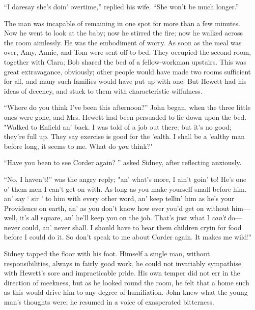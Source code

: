 ``I daresay she's doin' overtime,'' replied his wife. ``She won't be
much longer.''

The man was incapable of remaining in one spot for more than a few
minutes. Now he went to look at the baby; now he stirred the fire; now
he walked across the room aimlessly. He was the embodiment of worry. As
soon as the meal was over, Amy, Annie, and Tom were sent off to bed.
They occupied the second room, together with Clara; Bob shared the bed
of a fellow-workman upstairs. This was great extravagance, obviously;
other people would have made two rooms sufficient for all, and many such
families would have put up with one. But Hewett had his ideas of
decency, and stuck to them with characteristic wilfulness.

``Where do you think I've been this afternoon?'' John began, when the
three little ones were gone, and Mrs. Hewett had {}been persuaded to lie
down upon the bed. "Walked to Enfield an' back. I was told of a job out
there; but it's no good; they're full up. They say exercise is good for
the 'ealth. I shall be a 'ealthy man before long, it seems to me. What
do \emph{you} think?"

``Have you been to see Corder again? '' asked Sidney, after reflecting
anxiously.

``No, I haven't!'' was the angry reply; "an' what's more, I ain't goin'
to! He's one o' them men I can't get on with. As long as you make
yourself small before him, an' say ` sir ' to him with every other word,
an' keep tellin' him as he's your Providence on earth, an' as you don't
know how ever you'd get on without him---well, it's all square, an'
he'll keep you on the job. That's just what I \emph{can't} do---never
could, an' never shall. I should have to hear them children cryin for
food before I could do it. So don't speak to me about Corder again. It
makes me wild!"

Sidney tapped the floor with his foot. Himself a single man, without
responsibilities, always in fairly good work, he could not {}invariably
sympathise with Hewett's sore and impracticable pride. His own temper
did not err in the direction of meekness, but as he looked round the
room, he felt that a home such as this would drive him to any degree of
humiliation. John knew what the young man's thoughts were; he resumed in
a voice of exasperated bitterness.


